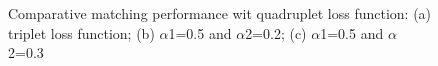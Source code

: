 \begin{figure}[ht!]
    \centering

    \caption{Comparative matching performance wit quadruplet loss function: (a) triplet loss function; (b) $\alpha$1=0.5 and $\alpha$2=0.2; (c) $\alpha$1=0.5 and $\alpha$2=0.3}
    \label{quadruplet}
\end{figure}
